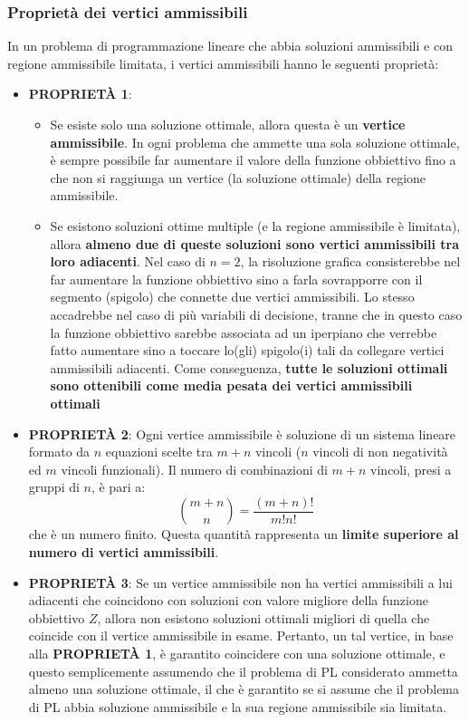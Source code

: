 \documentclass[12pt]{article}
\begin{document}
\subsubsection{Proprietà dei vertici ammissibili}
In un problema di programmazione lineare che abbia soluzioni ammissibili e con regione ammissibile limitata, i vertici ammissibili hanno le seguenti proprietà:
\begin{itemize}
    \item \textbf{PROPRIETÀ 1}:
    \begin{itemize}
        \item Se esiste solo una soluzione ottimale, allora questa è un \textbf{vertice ammissibile}. In ogni problema che ammette una sola soluzione ottimale, è sempre possibile far aumentare il valore della funzione obbiettivo fino a che non si raggiunga un vertice (la soluzione ottimale) della regione ammissibile.
        \item Se esistono soluzioni ottime multiple (e la regione ammissibile è limitata), allora \textbf{almeno due di queste soluzioni sono vertici ammissibili tra loro adiacenti}. Nel caso di $n = 2$, la risoluzione grafica consisterebbe nel far aumentare la funzione obbiettivo sino a farla sovrapporre con il segmento (spigolo) che connette due vertici ammissibili.
        Lo stesso accadrebbe nel caso di più variabili di decisione, tranne che in questo caso la funzione obbiettivo sarebbe associata ad un iperpiano che verrebbe fatto aumentare sino a toccare lo(gli) spigolo(i) tali da collegare vertici ammissibili adiacenti. Come conseguenza, \textbf{tutte le soluzioni ottimali sono ottenibili come media pesata dei vertici ammissibili ottimali}
    \end{itemize}
    \item \textbf{PROPRIETÀ 2}: Ogni vertice ammissibile è soluzione di un sistema lineare formato da $n$ equazioni scelte tra $m+n$ vincoli ($n$ vincoli di non negatività ed $m$ vincoli funzionali).
    Il numero di combinazioni di $m+n$ vincoli, presi a gruppi di $n$, è pari a:
    $$\binom{m+n}{n} = \frac{(m+n)!}{m!n!}$$
    che è un numero finito. Questa quantità rappresenta un \textbf{limite superiore al numero di vertici ammissibili}.
    \item \textbf{PROPRIETÀ 3}: Se un vertice ammissibile non ha vertici ammissibili a lui adiacenti che coincidono con soluzioni con valore migliore della funzione obbiettivo $Z$, allora non esistono soluzioni ottimali migliori di quella che coincide con il vertice ammissibile in esame.
    Pertanto, un tal vertice, in base alla \textbf{PROPRIETÀ 1}, è garantito coincidere con una soluzione ottimale, e questo semplicemente assumendo che il problema di PL considerato ammetta almeno una soluzione ottimale, il che è garantito se si assume che il problema di PL abbia soluzione ammissibile e la sua regione ammissibile sia limitata.

\end{itemize}
\end{document}
